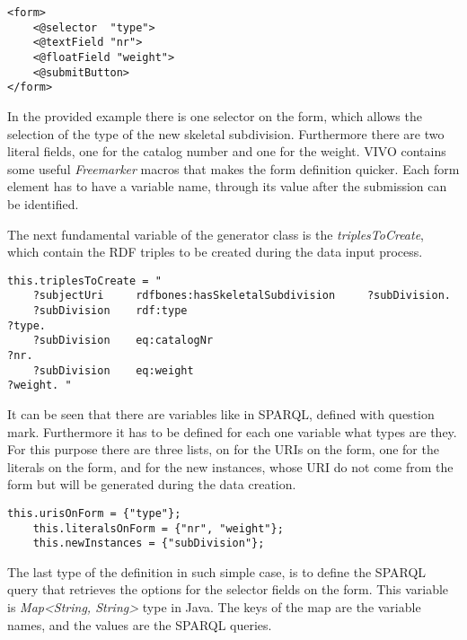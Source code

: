 \begin{lstlisting}[captionpos=b, caption= subdivision.ftl, label=skullJSON, belowskip=1em, aboveskip=2em,
basicstyle=\footnotesize,frame=single]
<form>
	<@selector	"type">
	<@textField	"nr">
	<@floatField "weight">
	<@submitButton>
</form>	
\end{lstlisting}

In the provided example there is one selector on the form, which allows the selection of the type of the new skeletal subdivision. Furthermore there are two literal fields, one for the catalog number and one for the weight. VIVO contains some useful \textit{Freemarker} macros that makes the form definition quicker. Each form element has to have a variable name, through its value after the submission can be identified.
 
The next fundamental variable of the generator class is the \textit{triplesToCreate}, which contain the RDF triples to be created during the data input process. 

\begin{lstlisting}[captionpos=b, caption= RDF Triples to create, label=skullJSON, belowskip=1em, aboveskip=2em,
basicstyle=\footnotesize,frame=single]
this.triplesToCreate = "
	?subjectUri		rdfbones:hasSkeletalSubdivision		?subDivision.
	?subDivision	rdf:type													?type.
	?subDivision	eq:catalogNr											?nr.
	?subDivision	eq:weight													?weight. "
\end{lstlisting}


It can be seen that there are variables like in SPARQL, defined with question mark. Furthermore it has to be defined for each one variable what types are they. For this purpose there are three lists, on for the URIs on the form, one for the literals on the form, and for the new instances, whose URI do not come from the form but will be generated during the data creation.

\begin{lstlisting}[captionpos=b, caption= Variable type definition, label=skullJSON, belowskip=1em, aboveskip=2em,
basicstyle=\footnotesize,frame=single]
	this.urisOnForm = {"type"};
	this.literalsOnForm	= {"nr", "weight"};
	this.newInstances = {"subDivision"};
\end{lstlisting}


The last type of the definition in such simple case, is to define the SPARQL query that retrieves the options for the selector fields on the form. This variable is \textit{Map<String, String>} type in Java. The keys of the map are the variable names, and the values are the SPARQL queries.

